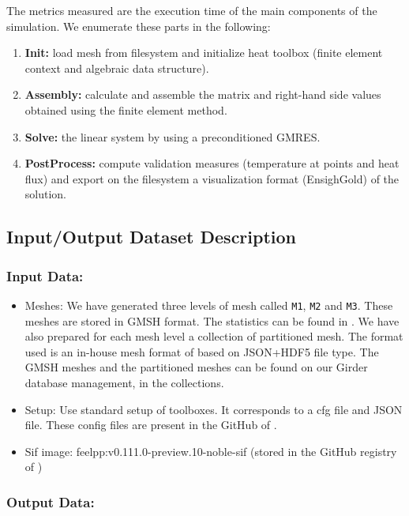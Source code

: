 The metrics measured are the execution time of the main components of the simulation.
We enumerate these parts in the following:
\begin{enumerate}
\item \textbf{Init:} load mesh from filesystem and initialize heat toolbox (finite element context and algebraic data structure).
\item \textbf{Assembly:} calculate and assemble the matrix and right-hand side values obtained using the finite element method.
\item \textbf{Solve:} the linear system by using a preconditioned GMRES.
\item \textbf{PostProcess:} compute validation measures (temperature at points and heat flux) and export on the filesystem a visualization format (EnsighGold) of the solution.
\end{enumerate}




\subsection{Input/Output Dataset Description}


\subsubsection{Input Data:}
  \begin{itemize}
  \item Meshes: We have generated three levels of mesh called \texttt{M1}, \texttt{M2}
    and \texttt{M3}. These meshes are stored in GMSH format. The statistics can be found in . We have also prepared for
    each mesh level a collection of partitioned mesh.
    The format used is an in-house mesh format of \Feelpp based on
    JSON+HDF5 file type.
    The GMSH meshes and the partitioned meshes can be found on our Girder
    database management, in the \Feelpp collections.
  \item Setup: Use standard setup of \Feelpp toolboxes. It corresponds to a cfg
    file and JSON file. These config files are present in the GitHub of \Feelpp.
  \item Sif image: feelpp:v0.111.0-preview.10-noble-sif  (stored in the GitHub registry of \Feelpp)
  \end{itemize}

\subsubsection{Output Data:}

